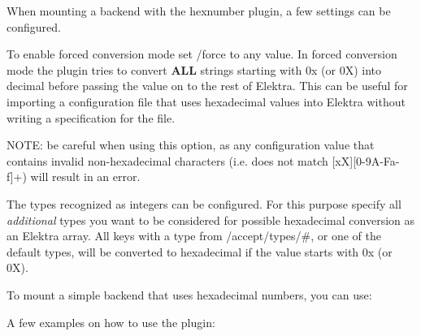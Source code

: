 When mounting a backend with the hexnumber plugin, a few settings can be configured.


\begin{DoxyEnumerate}
\item To enable forced conversion mode set {\ttfamily /force} to any value. In forced conversion mode the plugin tries to convert {\bfseries{A\+LL}} strings starting with {\ttfamily 0x} (or {\ttfamily 0X}) into decimal before passing the value on to the rest of Elektra. This can be useful for importing a configuration file that uses hexadecimal values into Elektra without writing a specification for the file.

N\+O\+TE\+: be careful when using this option, as any configuration value that contains invalid non-\/hexadecimal characters (i.\+e. does not match {\mbox{[}xX\mbox{]}\mbox{[}0-\/9A-\/\+Fa-\/f\mbox{]}+}) will result in an error.
\end{DoxyEnumerate}


\begin{DoxyCode}{0}
\end{DoxyCode}



\begin{DoxyEnumerate}
\item The types recognized as integers can be configured. For this purpose specify all {\itshape additional} types you want to be considered for possible hexadecimal conversion as an Elektra array. All keys with a type from {\ttfamily /accept/types/\#}, or one of the default types, will be converted to hexadecimal if the value starts with {\ttfamily 0x} (or {\ttfamily 0X}).
\end{DoxyEnumerate}


\begin{DoxyCode}{0}
\end{DoxyCode}



\begin{DoxyItemize}
\item To mount a simple backend that uses hexadecimal numbers, you can use\+: 
\begin{DoxyCode}{0}
\end{DoxyCode}

\item A few examples on how to use the plugin\+:
\end{DoxyItemize}



